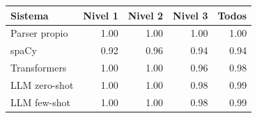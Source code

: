 \begin{tabular}{lrrrr}
\toprule
Sistema & Nivel 1 & Nivel 2 & Nivel 3 & Todos \\
\midrule
Parser propio & 1.00 & 1.00 & 1.00 & 1.00 \\
spaCy & 0.92 & 0.96 & 0.94 & 0.94 \\
Transformers & 1.00 & 1.00 & 0.96 & 0.98 \\
LLM zero-shot & 1.00 & 1.00 & 0.98 & 0.99 \\
LLM few-shot & 1.00 & 1.00 & 0.98 & 0.99 \\
\bottomrule
\end{tabular}
